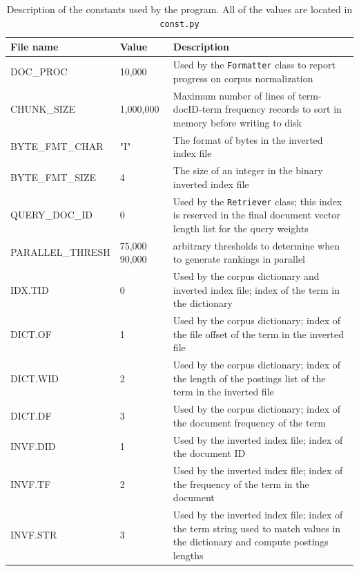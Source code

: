 \documentclass[11pt]{article}
\begin{document}
\begin{table}[!ht]
    \caption{Description of the constants used by the program. All of the values are located in \texttt{const.py}}
    \begin{center}

        \begin{tabular}{| L{4cm} | L{1.5cm} | L{9cm} |}
        \hline
        \textbf{File name} & \textbf{Value} & \textbf{Description}
        \\ \hline
        DOC\_PROC & 10,000 & Used by the \texttt{Formatter} class to report progress on corpus normalization
        \\ \hline
        CHUNK\_SIZE & 1,000,000 & Maximum number of lines of term-docID-term frequency records to sort in memory before writing to disk
        \\ \hline
        BYTE\_FMT\_CHAR & "I" & The format of bytes in the inverted index file
        \\ \hline
        BYTE\_FMT\_SIZE & 4 & The size of an integer in the binary inverted index file
        \\ \hline
        QUERY\_DOC\_ID & 0 & Used by the \texttt{Retriever} class; this index is reserved in the final document vector length list for the query weights
        \\ \hline
        PARALLEL\_THRESH & 75,000  90,000 & arbitrary thresholds to determine when to generate rankings in parallel
        \\ \hline
        IDX.TID & 0 & Used by the corpus dictionary and inverted index file; index of the term in the dictionary
        \\ \hline
        DICT.OF & 1 & Used by the corpus dictionary; index of the file offset of the term in the inverted file
        \\ \hline
        DICT.WID & 2 & Used by the corpus dictionary; index of the length of the postings list of the term in the inverted file
        \\ \hline
        DICT.DF & 3 & Used by the corpus dictionary; index of the document frequency of the term
        \\ \hline
        INVF.DID & 1 & Used by the inverted index file; index of the document ID
        \\ \hline
        INVF.TF & 2 & Used by the inverted index file; index of the frequency of the term in the document
        \\ \hline
        INVF.STR & 3 & Used by the inverted index file; index of the term string used to match values in the dictionary and compute postings lengths
        \\ \hline
        \end{tabular}

    \end{center}

\end{table}
\newpage
\end{document}
